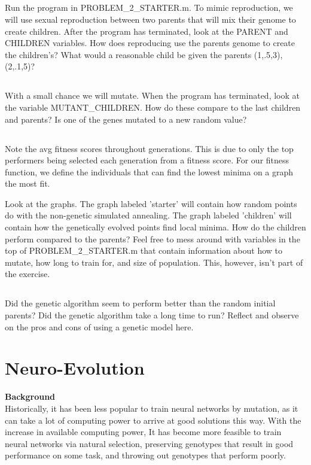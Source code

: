 \documentclass[12]{extarticle}
\begin{document}
\subsection{}
 Run the program in PROBLEM\_2\_STARTER.m.  To mimic reproduction, we will use sexual reproduction between two parents that will mix their genome to create children. After the program has terminated, look at the PARENT and CHILDREN variables.  How does reproducing use the parents genome to create the children's?  What would a reasonable child be given the parents (1,.5,3), (2,.1,5)?

\subsection{}
With a small chance we will mutate. When the program has terminated, look at the variable MUTANT\_CHILDREN.  How do these compare to the last children and parents? Is one of the genes mutated to a new random value?

\subsection{}
Note the avg fitness scores throughout generations. This is due to only the top performers being selected each generation from a fitness score.  For our fitness function, we define the individuals that can find the lowest minima on a graph the most fit.

Look at the graphs.  The graph labeled 'starter' will contain how random points do with the non-genetic simulated annealing.  The graph labeled 'children' will contain how the genetically evolved points find local minima. How do the children perform compared to the parents?  Feel free to mess around with variables in the top of PROBLEM\_2\_STARTER.m that contain information about how to mutate, how long to train for, and size of population. This, however, isn't part of the exercise.


\subsection{} Did the genetic algorithm seem to perform better than the random initial parents?  Did the genetic algorithm take a long time to run?  Reflect and observe on the pros and cons of using a genetic model here.


\section{Neuro-Evolution}
\textbf{Background} \\
Historically, it has been less popular to train neural networks by mutation, as it can take a lot of computing power to arrive at good solutions this way. With the increase in available computing power, It has become more feasible to train neural networks via natural selection, preserving genotypes that result in good performance on some task, and throwing out genotypes that perform poorly. 
\end{document}
